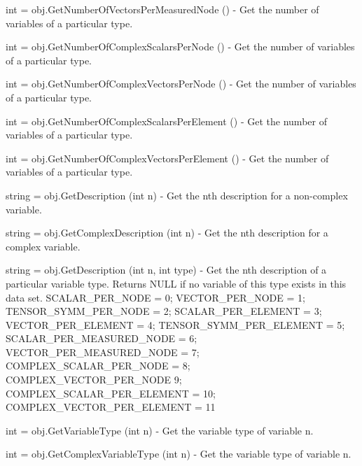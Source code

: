 \begin{DoxyItemize}
\item {\ttfamily int = obj.\-Get\-Number\-Of\-Vectors\-Per\-Measured\-Node ()} -\/ Get the number of variables of a particular type.  
\item {\ttfamily int = obj.\-Get\-Number\-Of\-Complex\-Scalars\-Per\-Node ()} -\/ Get the number of variables of a particular type.  
\item {\ttfamily int = obj.\-Get\-Number\-Of\-Complex\-Vectors\-Per\-Node ()} -\/ Get the number of variables of a particular type.  
\item {\ttfamily int = obj.\-Get\-Number\-Of\-Complex\-Scalars\-Per\-Element ()} -\/ Get the number of variables of a particular type.  
\item {\ttfamily int = obj.\-Get\-Number\-Of\-Complex\-Vectors\-Per\-Element ()} -\/ Get the number of variables of a particular type.  
\item {\ttfamily string = obj.\-Get\-Description (int n)} -\/ Get the nth description for a non-\/complex variable.  
\item {\ttfamily string = obj.\-Get\-Complex\-Description (int n)} -\/ Get the nth description for a complex variable.  
\item {\ttfamily string = obj.\-Get\-Description (int n, int type)} -\/ Get the nth description of a particular variable type. Returns N\-U\-L\-L if no variable of this type exists in this data set. S\-C\-A\-L\-A\-R\-\_\-\-P\-E\-R\-\_\-\-N\-O\-D\-E = 0; V\-E\-C\-T\-O\-R\-\_\-\-P\-E\-R\-\_\-\-N\-O\-D\-E = 1; T\-E\-N\-S\-O\-R\-\_\-\-S\-Y\-M\-M\-\_\-\-P\-E\-R\-\_\-\-N\-O\-D\-E = 2; S\-C\-A\-L\-A\-R\-\_\-\-P\-E\-R\-\_\-\-E\-L\-E\-M\-E\-N\-T = 3; V\-E\-C\-T\-O\-R\-\_\-\-P\-E\-R\-\_\-\-E\-L\-E\-M\-E\-N\-T = 4; T\-E\-N\-S\-O\-R\-\_\-\-S\-Y\-M\-M\-\_\-\-P\-E\-R\-\_\-\-E\-L\-E\-M\-E\-N\-T = 5; S\-C\-A\-L\-A\-R\-\_\-\-P\-E\-R\-\_\-\-M\-E\-A\-S\-U\-R\-E\-D\-\_\-\-N\-O\-D\-E = 6; V\-E\-C\-T\-O\-R\-\_\-\-P\-E\-R\-\_\-\-M\-E\-A\-S\-U\-R\-E\-D\-\_\-\-N\-O\-D\-E = 7; C\-O\-M\-P\-L\-E\-X\-\_\-\-S\-C\-A\-L\-A\-R\-\_\-\-P\-E\-R\-\_\-\-N\-O\-D\-E = 8; C\-O\-M\-P\-L\-E\-X\-\_\-\-V\-E\-C\-T\-O\-R\-\_\-\-P\-E\-R\-\_\-\-N\-O\-D\-E 9; C\-O\-M\-P\-L\-E\-X\-\_\-\-S\-C\-A\-L\-A\-R\-\_\-\-P\-E\-R\-\_\-\-E\-L\-E\-M\-E\-N\-T = 10; C\-O\-M\-P\-L\-E\-X\-\_\-\-V\-E\-C\-T\-O\-R\-\_\-\-P\-E\-R\-\_\-\-E\-L\-E\-M\-E\-N\-T = 11  
\item {\ttfamily int = obj.\-Get\-Variable\-Type (int n)} -\/ Get the variable type of variable n.  
\item {\ttfamily int = obj.\-Get\-Complex\-Variable\-Type (int n)} -\/ Get the variable type of variable n.  

\end{DoxyItemize}
